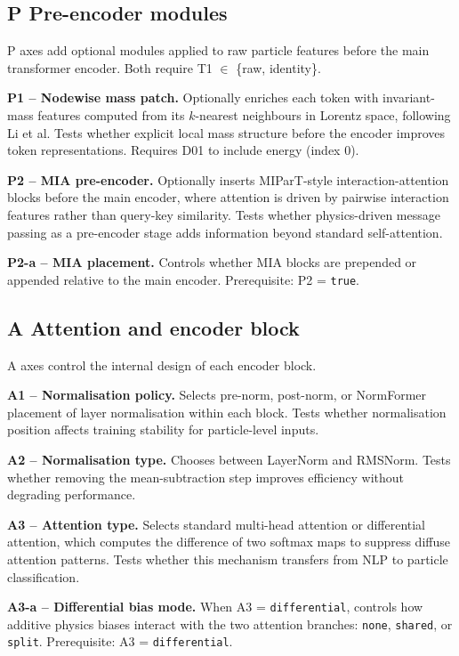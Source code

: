 \subsection*{P \quad Pre-encoder modules}

P axes add optional modules applied to raw particle features before the
main transformer encoder. Both require T1 $\in$ \{raw, identity\}.

\textbf{P1 -- Nodewise mass patch.} Optionally enriches each token with
invariant-mass features computed from its $k$-nearest neighbours in
Lorentz space, following Li et al. Tests whether explicit local mass
structure before the encoder improves token representations. Requires
D01 to include energy (index 0).

\textbf{P2 -- MIA pre-encoder.} Optionally inserts MIParT-style
interaction-attention blocks before the main encoder, where attention
is driven by pairwise interaction features rather than query-key
similarity. Tests whether physics-driven message passing as a
pre-encoder stage adds information beyond standard self-attention.

\textbf{P2-a -- MIA placement.} Controls whether MIA blocks are
prepended or appended relative to the main encoder. Prerequisite:
P2 = \texttt{true}.

\subsection*{A \quad Attention and encoder block}

A axes control the internal design of each encoder block.

\textbf{A1 -- Normalisation policy.} Selects pre-norm, post-norm, or
NormFormer placement of layer normalisation within each block. Tests
whether normalisation position affects training stability for
particle-level inputs.

\textbf{A2 -- Normalisation type.} Chooses between LayerNorm and
RMSNorm. Tests whether removing the mean-subtraction step improves
efficiency without degrading performance.

\textbf{A3 -- Attention type.} Selects standard multi-head attention
or differential attention, which computes the difference of two softmax
maps to suppress diffuse attention patterns. Tests whether this
mechanism transfers from NLP to particle classification.

\textbf{A3-a -- Differential bias mode.} When A3 =
\texttt{differential}, controls how additive physics biases interact
with the two attention branches: \texttt{none}, \texttt{shared}, or
\texttt{split}. Prerequisite: A3 = \texttt{differential}.


